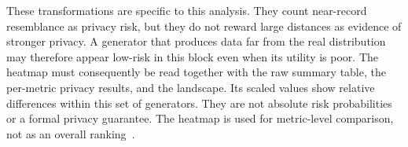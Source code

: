 These transformations are specific to this analysis. They count
near-record resemblance as privacy risk, but they do not reward large
distances as evidence of stronger privacy. A generator that produces data
far from the real distribution may therefore appear low-risk in this
block even when its utility is poor. The heatmap must consequently be
read together with the raw summary table, the per-metric privacy results,
and the landscape. Its scaled values show relative differences within
this set of generators. They are not absolute risk probabilities or a
formal privacy guarantee. The heatmap is used for metric-level comparison,
not as an overall ranking~\cite{thees2025beyond}.
